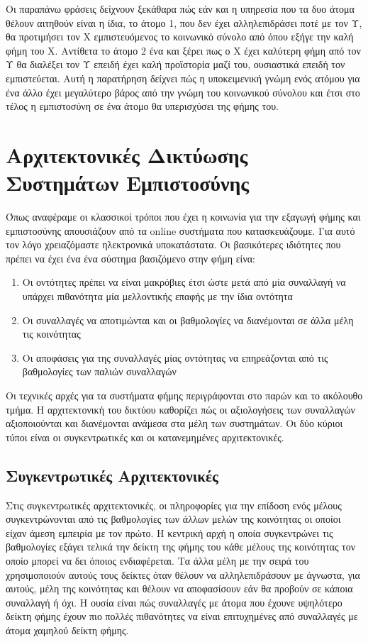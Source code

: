 Οι παραπάνω φράσεις δείχνουν ξεκάθαρα πώς εάν και η υπηρεσία που τα δυο άτομα θέλουν αιτηθούν είναι η ίδια, το άτομο 1, που δεν έχει αλληλεπιδράσει ποτέ με τον Υ, θα προτιμήσει τον Χ εμπιστευόμενος το κοινωνικό σύνολο από όπου εξήγε την καλή φήμη του Χ. Αντίθετα το άτομο 2 ένα και ξέρει πως ο Χ έχει καλύτερη φήμη από τον Υ θα διαλέξει τον Υ επειδή έχει καλή προϊστορία μαζί του, ουσιαστικά επειδή τον εμπιστεύεται. Αυτή η παρατήρηση δείχνει πώς η υποκειμενική γνώμη ενός ατόμου για ένα άλλο έχει μεγαλύτερο βάρος από την γνώμη του κοινωνικού σύνολου και έτσι στο τέλος η εμπιστοσύνη σε ένα άτομο θα υπερισχύσει της φήμης του.

\section{Αρχιτεκτονικές Δικτύωσης Συστημάτων Εμπιστοσύνης}

Όπως αναφέραμε οι κλασσικοί τρόποι που έχει η κοινωνία για την εξαγωγή φήμης και εμπιστοσύνης απουσιάζουν από τα online συστήματα που κατασκευάζουμε. Για αυτό τον λόγο χρειαζόμαστε ηλεκτρονικά υποκατάστατα. Οι βασικότερες ιδιότητες που πρέπει να έχει ένα ένα σύστημα βασιζόμενο στην φήμη είνα: %

\begin{enumerate}
\item Οι οντότητες πρέπει να είναι μακρόβιες έτσι ώστε μετά από μία συναλλαγή να υπάρχει πιθανότητα μία μελλοντικής επαφής με την ίδια οντότητα

\item Οι συναλλαγές να αποτιμώνται και οι βαθμολογίες να διανέμονται σε άλλα μέλη τις κοινότητας

\item Οι αποφάσεις για της συναλλαγές μίας οντότητας να επηρεάζονται από τις βαθμολογίες των παλιών συναλλαγών
\end{enumerate}

Οι τεχνικές αρχές για τα συστήματα φήμης περιγράφονται στο παρών και το ακόλουθο τμήμα. Η αρχιτεκτονική του δικτύου καθορίζει πώς οι αξιολογήσεις των συναλλαγών αξιοποιούνται και διανέμονται ανάμεσα στα μέλη των συστημάτων. Οι δύο κύριοι τύποι είναι οι συγκεντρωτικές και οι κατανεμημένες αρχιτεκτονικές.%
\subsection{Συγκεντρωτικές Αρχιτεκτονικές}

Στις συγκεντρωτικές αρχιτεκτονικές, οι πληροφορίες για την επίδοση ενός μέλους συγκεντρώνονται από τις βαθμολογίες των άλλων μελών της κοινότητας οι οποίοι είχαν άμεση εμπειρία με τον πρώτο. Η κεντρική αρχή η οποία συγκεντρώνει τις βαθμολογίες εξάγει τελικά την δείκτη της φήμης του κάθε μέλους της κοινότητας τον οποίο μπορεί να δει όποιος ενδιαφέρεται. Τα άλλα μέλη με την σειρά του χρησιμοποιούν αυτούς τους δείκτες όταν θέλουν να αλληλεπιδράσουν με άγνωστα, για αυτούς, μέλη της κοινότητας και θέλουν να αποφασίσουν εάν θα προβούν σε κάποια συναλλαγή ή όχι. Η ουσία είναι πώς συναλλαγές με άτομα που έχουνε υψηλότερο δείκτη φήμης έχουν πιο πολλές πιθανότητες να είναι επιτυχημένες από συναλλαγές με άτομα χαμηλού δείκτη φήμης.

